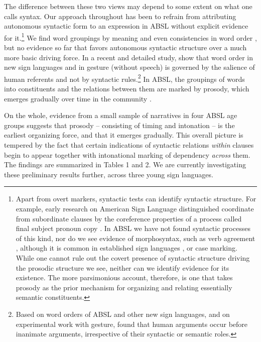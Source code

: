 \documentclass[output=paper]{langsci/langscibook}
\begin{document}
    The difference between these two views may depend to some extent on what one calls syntax.  Our approach throughout has been to refrain from attributing autonomous syntactic form to an expression in ABSL without explicit evidence for it.\footnote{Apart from overt markers, syntactic tests can identify syntactic structure.  For example, early research on American Sign Language distinguished coordinate from subordinate clauses by the coreference properties of a process called final subject pronoun copy \citep{Padden1988}.  In ABSL we have not found syntactic processes of this kind, nor do we see evidence of morphosyntax, such as verb agreement \citep{Padden2010}, although it is common in established sign languages \citep{Aronoff2005}, or case marking.  While one cannot rule out the covert presence of syntactic structure driving the prosodic structure we see, neither can we identify evidence for its existence.  The more parsimonious account, therefore, is one that takes prosody as the prior mechanism for organizing and relating essentially semantic constituents.}  We find word groupings by meaning and even consistencies in word order \citep{Sandler2005}, but no evidence so far that favors autonomous syntactic structure over a much more basic driving force.  In a recent and detailed study, \citet{MeirSubmitted} show that word order in new sign languages and in gesture (without speech) is governed by the salience of human referents and not by syntactic rules.\footnote{Based on word orders of ABSL and other new sign languages, and on experimental work with gesture, \citet{MeirSubmitted} found that human arguments occur before inanimate arguments, irrespective of their syntactic or semantic roles.}  In ABSL, the groupings of words into constituents and the relations between them are marked by prosody, which emerges gradually over time in the community \citep{Sandler2011b}.

 On the whole, evidence from a small sample of narratives in four ABSL age groups suggests that prosody – consisting of timing and intonation -- is the earliest organizing force, and that it emerges gradually.  This overall picture is tempered by the fact that certain indications of syntactic relations \textit{within} clauses begin to appear together with intonational marking of dependency \textit{across} them. The findings are summarized in Tables 1 and 2. We are currently investigating these preliminary results further, across three young sign languages.
\end{document}
